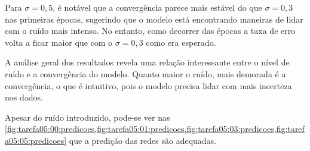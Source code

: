 Para $\sigma=0,5$, é notável que a convergência parece 
mais estável do que $\sigma=0,3$ nas primeiras épocas, sugerindo que o modelo 
está encontrando maneiras de lidar com o ruído mais intenso. No entanto, como 
decorrer 
das épocas a taxa de erro volta a ficar maior que com o $\sigma=0,3$ como era 
esperado. 

A análise geral dos resultados revela uma relação interessante entre o nível de 
ruído e a convergência do modelo. Quanto maior o ruído, mais demorada é a 
convergência, o que é intuitivo, pois o modelo precisa lidar com mais incerteza 
nos dados. 

Apesar do ruído introduzido, pode-se ver nas 
\cref{fig:tarefa05:00:predicoes,fig:tarefa05:01:predicoes,fig:tarefa05:03:predicoes,fig:tarefa05:05:predicoes}
 que a predição das redes 
são adequadas.

